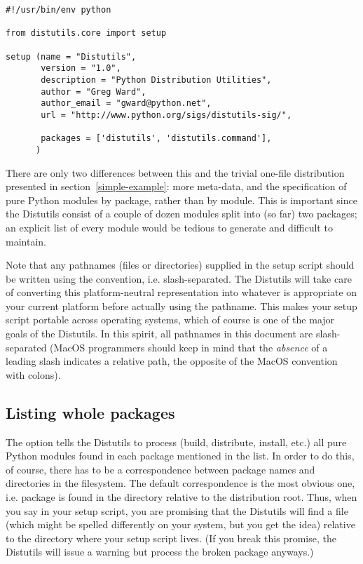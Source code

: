 \documentclass{howto}
\begin{document}
\begin{verbatim}
#!/usr/bin/env python

from distutils.core import setup

setup (name = "Distutils",
       version = "1.0",
       description = "Python Distribution Utilities",
       author = "Greg Ward",
       author_email = "gward@python.net",
       url = "http://www.python.org/sigs/distutils-sig/",

       packages = ['distutils', 'distutils.command'],
      )
\end{verbatim}
There are only two differences between this and the trivial one-file
distribution presented in section~\ref{simple-example}: more
meta-data, and the specification of pure Python modules by package,
rather than by module.  This is important since the Distutils consist of
a couple of dozen modules split into (so far) two packages; an explicit
list of every module would be tedious to generate and difficult to
maintain.

Note that any pathnames (files or directories) supplied in the setup
script should be written using the \UNIX{} convention, i.e.
slash-separated.  The Distutils will take care of converting this
platform-neutral representation into whatever is appropriate on your
current platform before actually using the pathname.  This makes your
setup script portable across operating systems, which of course is one
of the major goals of the Distutils.  In this spirit, all pathnames in
this document are slash-separated (MacOS programmers should keep in
mind that the \emph{absence} of a leading slash indicates a relative
path, the opposite of the MacOS convention with colons).


\subsection{Listing whole packages}
\label{listing-packages}

The  option tells the Distutils to process (build,
distribute, install, etc.) all pure Python modules found in each package
mentioned in the  list.  In order to do this, of
course, there has to be a correspondence between package names and
directories in the filesystem.  The default correspondence is the most
obvious one, i.e. package  is found in the directory
 relative to the distribution root.  Thus, when you say
 in your setup script, you are promising that
the Distutils will find a file  (which might
be spelled differently on your system, but you get the idea) relative to
the directory where your setup script lives.  (If you break this
promise, the Distutils will issue a warning but process the broken
package anyways.)
\end{document}
